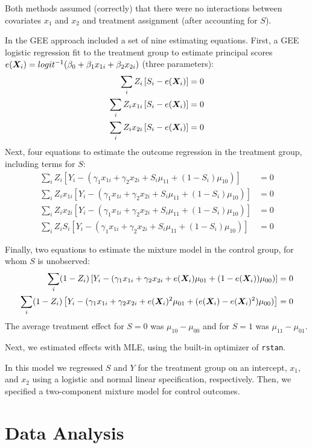 \documentclass[11pt]{article} %
\begin{document}
Both methods assumed (correctly) that there were no interactions
between covariates $x_1$ and $x_2$ and treatment assignment (after
accounting for $S$).

In the GEE approach included a set of nine estimating equations.
First, a GEE logistic regression fit to the treatment group to
estimate principal scores
$e(\bm{X}_i)=logit^{-1}(\beta_0+\beta_1x_{1i}+\beta_2x_{2i})$ (three parameters):
\begin{align*}
  \sum_iZ_i\left[S_i-e(\bm{X}_i)\right]&=0\\
  \sum_iZ_ix_{1i}\left[S_i-e(\bm{X}_i)\right]&=0\\
  \sum_iZ_ix_{2i}\left[S_i-e(\bm{X}_i)\right]&=0
\end{align*}
Next, four equations to estimate the outcome regression in the
treatment group, including terms for $S$:
\begin{align*}
  \sum_i
  Z_i\left[Y_i-(\gamma_1x_{1i}+\gamma_2x_{2i}+S_i\mu_{11}+(1-S_i)\mu_{10})\right]&=0\\
  \sum_i
  Z_ix_{1i}\left[Y_i-(\gamma_1x_{1i}+\gamma_2x_{2i}+S_i\mu_{11}+(1-S_i)\mu_{10})\right]&=0\\
  \sum_i
  Z_ix_{2i}\left[Y_i-(\gamma_1x_{1i}+\gamma_2x_{2i}+S_i\mu_{11}+(1-S_i)\mu_{10})\right]&=0\\
  \sum_i
  Z_iS_i\left[Y_i-(\gamma_1x_{1i}+\gamma_2x_{2i}+S_i\mu_{11}+(1-S_i)\mu_{10})\right]&=0
\end{align*}

Finally, two equations to estimate the mixture model in the control
group, for whom $S$ is unobserved:
\begin{align*}
  \sum_i
  (1-Z_i)\left[Y_i-(\gamma_1x_{1i}+\gamma_2x_{2i}+e(\bm{X}_i)\mu_{01}+(1-e(\bm{X}_i))\mu_{00})\right]&=0\\
  \sum_i
  (1-Z_i)\left[Y_i-(\gamma_1x_{1i}+\gamma_2x_{2i}+e(\bm{X}_i)^2\mu_{01}+(e(\bm{X}_i)-e(\bm{X}_i)^2)\mu_{00})\right]&=0
\end{align*}
The average treatment effect for $S=0$ was $\mu_{10}-\mu_{00}$ and for
$S=1$ was $\mu_{11}-\mu_{01}$.

Next, we estimated effects with MLE, using the built-in optimizer of
\texttt{rstan}.

In this model we regressed $S$ and $Y$ for the treatment group on an
intercept, $x_1$, and $x_2$ using a logistic and normal linear
specification, respectively.
Then, we specified a two-component mixture model for control
outcomes.


\section{Data Analysis}
\end{document}
